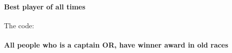 \documentclass[a4paper,10pt,english]{sphinxmanual}
\begin{document}
\paragraph{Best player of all times}
\label{developer/member2:best-player-of-all-times}\begin{quote}

\end{quote}

The code:
\begin{quote}

\end{quote}


\paragraph{All people who is a captain OR, have winner award in old races}
\label{developer/member2:all-people-who-is-a-captain-or-have-winner-award-in-old-races}\begin{quote}

\end{quote}
\end{document}
